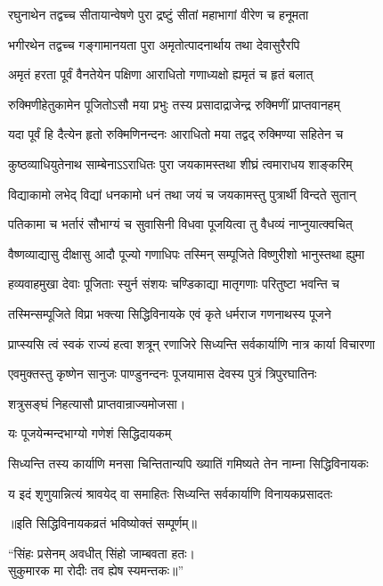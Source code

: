 \begin{center}
\twolineshloka
{रघुनाथेन तद्वच्च सीतायान्वेषणे पुरा}
{द्रष्टुं सीतां महाभागां वीरेण च हनूमता}%

\twolineshloka
{भगीरथेन तद्वच्च गङ्गामानयता पुरा}
{अमृतोत्पादनार्थाय तथा देवासुरैरपि}%

\twolineshloka
{अमृतं हरता पूर्वं वैनतेयेन पक्षिणा}
{आराधितो गणाध्यक्षो ह्यमृतं च हृतं बलात्}%

\twolineshloka
{रुक्मिणीहेतुकामेन पूजितोऽसौ मया प्रभुः}
{तस्य प्रसादाद्राजेन्द्र रुक्मिणीं प्राप्तवानहम्}%

\twolineshloka
{यदा पूर्वं हि दैत्येन हृतो रुक्मिणिनन्दनः}
{आराधितो मया तद्वद् रुक्मिण्या सहितेन च}%

\twolineshloka
{कुष्ठव्याधियुतेनाथ साम्बेनाऽऽराधितः पुरा}
{जयकामस्तथा शीघ्रं त्वमाराधय शाङ्करिम्}%

\twolineshloka
{विद्याकामो लभेद् विद्यां धनकामो धनं तथा}
{जयं च जयकामस्तु पुत्रार्थी विन्दते सुतान्}%

\twolineshloka
{पतिकामा च भर्तारं सौभाग्यं च सुवासिनी}
{विधवा पूजयित्वा तु वैधव्यं नाप्नुयात्क्वचित्}%

\twolineshloka
{वैष्णव्याद्यासु दीक्षासु आदौ पूज्यो गणाधिपः}
{तस्मिन् सम्पूजिते विष्णुरीशो भानुस्तथा ह्युमा}%

\twolineshloka
{हव्यवाहमुखा देवाः पूजिताः स्युर्न संशयः}
{चण्डिकाद्या मातृगणाः परितुष्टा भवन्ति च}%

\twolineshloka
{तस्मिन्सम्पूजिते विप्रा भक्त्या सिद्धिविनायके}
{एवं कृते धर्मराज गणनाथस्य पूजने}%

\twolineshloka
{प्राप्स्यसि त्वं स्वकं राज्यं हत्वा शत्रून् रणाजिरे}
{सिध्यन्ति सर्वकार्याणि नात्र कार्या विचारणा}%

\twolineshloka
{एवमुक्तस्तु कृष्णेन सानुजः पाण्डुनन्दनः}
{पूजयामास देवस्य पुत्रं त्रिपुरघातिनः}%

शत्रुसङ्घं निहत्यासौ प्राप्तवान्राज्यमोजसा।

\onelineshloka
{यः पूजयेन्मन्दभाग्यो गणेशं सिद्धिदायकम्}%

\twolineshloka
{सिध्यन्ति तस्य कार्याणि मनसा चिन्तितान्यपि}
{ख्यातिं गमिष्यते तेन नाम्ना सिद्धिविनायकः}%

\twolineshloka
{य इदं शृणुयान्नित्यं श्रावयेद् वा समाहितः}
{सिध्यन्ति सर्वकार्याणि विनायकप्रसादतः}%

॥इति सिद्धिविनायकव्रतं भविष्योक्तं सम्पूर्णम्॥

“सिंहः प्रसेनम् अवधीत् सिंहो जाम्बवता हतः।\\
सुकुमारक मा रोदीः तव ह्येष स्यमन्तकः॥”\\


\end{center}

